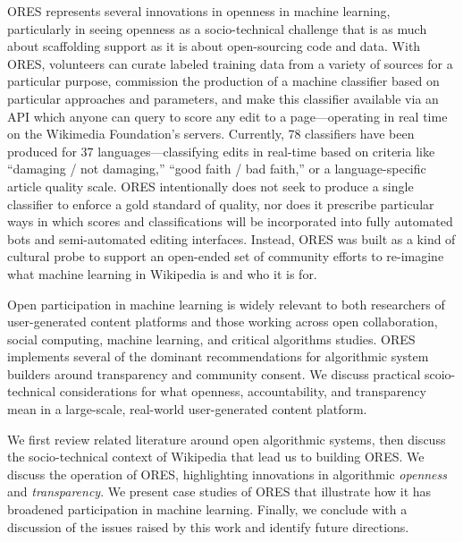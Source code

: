 ORES represents several innovations in openness in machine learning, particularly in seeing openness as a socio-technical challenge that is as much about scaffolding support as it is about open-sourcing code and data. With ORES, volunteers can curate labeled training data from a variety of sources for a particular purpose, commission the production of a machine classifier based on particular approaches and parameters, and make this classifier available via an API which anyone can query to score any edit to a page---operating in real time on the Wikimedia Foundation's servers. Currently, 78 classifiers have been produced for 37 languages---classifying edits in real-time based on criteria like ``damaging / not damaging,'' ``good faith / bad faith,'' or a language-specific article quality scale. ORES intentionally does not seek to produce a single classifier to enforce a gold standard of quality, nor does it prescribe particular ways in which scores and classifications will be incorporated into fully automated bots and semi-automated editing interfaces. Instead, ORES was built as a kind of cultural probe \cite{hutchinson2003technology} to support an open-ended set of community efforts to re-imagine what machine learning in Wikipedia is and who it is for.

Open participation in machine learning is widely relevant to both researchers of user-generated content platforms and those working across open collaboration, social computing, machine learning, and critical algorithms studies. ORES implements several of the dominant recommendations for algorithmic system builders around transparency and community consent\cite{crawford2016algorithm,diakopoulos2015algorithmic,sandvig2014auditing}. We discuss practical scoio-technical considerations for what openness, accountability, and transparency mean in a large-scale, real-world user-generated content platform.

We first review related literature around open algorithmic systems, then discuss the socio-technical context of Wikipedia that lead us to building ORES. We discuss the operation of ORES, highlighting innovations in algorithmic \emph{openness} and \emph{transparency}. We present case studies of ORES that illustrate how it has broadened participation in machine learning.  Finally, we conclude with a discussion of the issues raised by this work and identify future directions.
